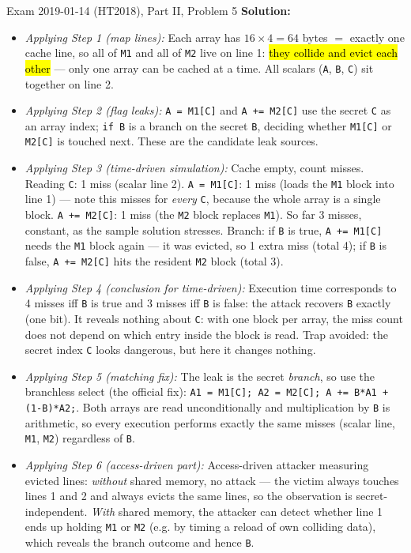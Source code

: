\documentclass[12pt, a4paper]{article}
\newcommand{\imp}[1]{\hl{#1}}                       %
\begin{document}
\begin{practicebox}{Exam 2019-01-14 (HT2018), Part II, Problem 5}
\textbf{Solution:}
\begin{itemize}
    \item \textit{Applying Step 1 (map lines):} Each array has $16 \times 4 = 64$ bytes $=$ exactly one cache line, so all of \texttt{M1} and all of \texttt{M2} live on line 1: \imp{they collide and evict each other} --- only one array can be cached at a time. All scalars (\texttt{A}, \texttt{B}, \texttt{C}) sit together on line 2.
    \item \textit{Applying Step 2 (flag leaks):} \texttt{A = M1[C]} and \texttt{A += M2[C]} use the secret \texttt{C} as an array index; \texttt{if B} is a branch on the secret \texttt{B}, deciding whether \texttt{M1[C]} or \texttt{M2[C]} is touched next. These are the candidate leak sources.
    \item \textit{Applying Step 3 (time-driven simulation):} Cache empty, count misses. Reading \texttt{C}: 1 miss (scalar line 2). \texttt{A = M1[C]}: 1 miss (loads the \texttt{M1} block into line 1) --- note this misses for \emph{every} \texttt{C}, because the whole array is a single block. \texttt{A += M2[C]}: 1 miss (the \texttt{M2} block replaces \texttt{M1}). So far 3 misses, constant, as the sample solution stresses. Branch: if \texttt{B} is true, \texttt{A += M1[C]} needs the \texttt{M1} block again --- it was evicted, so 1 extra miss (total 4); if \texttt{B} is false, \texttt{A += M2[C]} hits the resident \texttt{M2} block (total 3).
    \item \textit{Applying Step 4 (conclusion for time-driven):} Execution time corresponds to 4 misses iff \texttt{B} is true and 3 misses iff \texttt{B} is false: the attack recovers \texttt{B} exactly (one bit). It reveals nothing about \texttt{C}: with one block per array, the miss count does not depend on which entry inside the block is read. Trap avoided: the secret index \texttt{C} looks dangerous, but here it changes nothing.
    \item \textit{Applying Step 5 (matching fix):} The leak is the secret \emph{branch}, so use the branchless select (the official fix): \texttt{A1 = M1[C]; A2 = M2[C]; A += B*A1 + (1-B)*A2;}. Both arrays are read unconditionally and multiplication by \texttt{B} is arithmetic, so every execution performs exactly the same misses (scalar line, \texttt{M1}, \texttt{M2}) regardless of \texttt{B}.
    \item \textit{Applying Step 6 (access-driven part):} Access-driven attacker measuring evicted lines: \emph{without} shared memory, no attack --- the victim always touches lines 1 and 2 and always evicts the same lines, so the observation is secret-independent. \emph{With} shared memory, the attacker can detect whether line 1 ends up holding \texttt{M1} or \texttt{M2} (e.g. by timing a reload of own colliding data), which reveals the branch outcome and hence \texttt{B}.

\end{itemize}
\end{practicebox}
\end{document}

